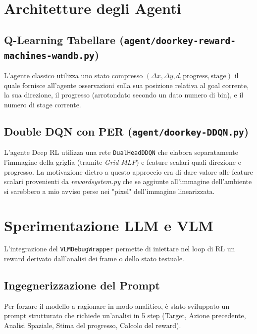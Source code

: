 \documentclass[12pt,a4paper]{article}
\begin{document}
\section{Architetture degli Agenti}
\subsection{Q-Learning Tabellare (\texttt{agent/doorkey-reward-machines-wandb.py})}
L'agente classico utilizza uno stato compresso $(\Delta x, \Delta y, d, \text{progress}, \text{stage})$ il quale fornisce all'agente osservazioni sulla sua posizione relativa al goal corrente, la sua direzione, il progresso (arrotondato secondo un dato numero di bin), e il numero di stage corrente.


\subsection{Double DQN con PER (\texttt{agent/doorkey-DDQN.py})}
L'agente Deep RL utilizza una rete \texttt{DualHeadDDQN} che elabora separatamente l'immagine della griglia (tramite \textit{Grid MLP}) e feature scalari quali direzione e progresso. La motivazione dietro a questo approccio era di dare valore alle feature scalari provenienti da \textit{rewardsystem.py} che se aggiunte all'immagine dell'ambiente si sarebbero a mio avviso perse nei "pixel" dell'immagine linearizzata.


\newpage
\section{Sperimentazione LLM e VLM}
L'integrazione del \texttt{VLMDebugWrapper} permette di iniettare nel loop di RL un reward derivato dall'analisi dei frame o dello stato testuale.

\subsection{Ingegnerizzazione del Prompt}
Per forzare il modello a ragionare in modo analitico, è stato sviluppato un prompt strutturato che richiede un'analisi in 5 step (Target, Azione precedente, Analisi Spaziale, Stima del progresso, Calcolo del reward).
\end{document}
